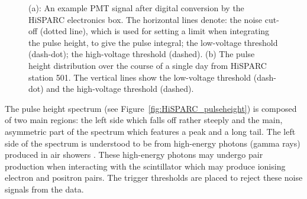 \begin{figure}[ht!]
	\centering
	
	\caption{(a): An example PMT signal after digital conversion by the HiSPARC electronics box. The horizontal lines denote: the noise cut-off (dotted line), which is used for setting a limit when integrating the pulse height, to give the pulse integral; the low-voltage threshold (dash-dot); the high-voltage threshold (dashed). (b) The pulse height distribution over the course of a single day from HiSPARC station 501. The vertical lines show the low-voltage threshold (dash-dot) and the high-voltage threshold (dashed).}
	\label{fig:pulses}
\end{figure}

The pulse height spectrum (see Figure~\ref{fig:HiSPARC_pulseheight}) is composed of two main regions: the left side which falls off rather steeply and the main, asymmetric part of the spectrum which features a peak and a long tail. The left side of the spectrum is understood to be from high-energy photons (gamma rays) produced in air showers \citep{fokkema_hisparc_2012}. These high-energy photons may undergo pair production when interacting with the scintillator which may produce ionising electron and positron pairs. The trigger thresholds are placed to reject these noise signals from the data.

